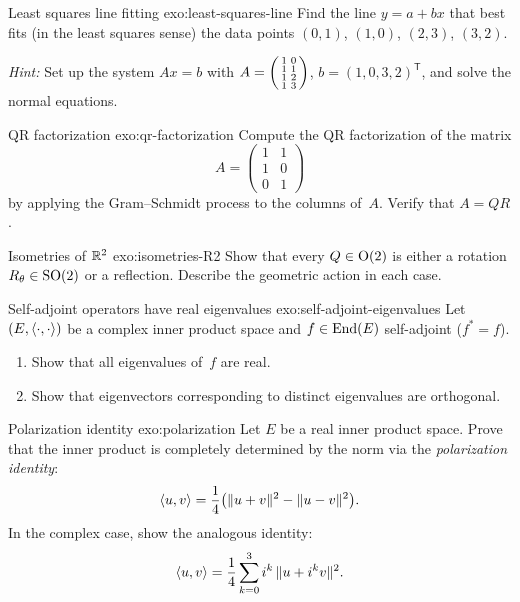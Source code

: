 \begin{exercise}{Least squares line fitting \intermediate}%
{exo:least-squares-line}
Find the line $y = a + bx$ that best fits (in the least squares sense)
the data points $(0,1)$, $(1,0)$, $(2,3)$, $(3,2)$.

\noindent\textit{Hint:} Set up the system $Ax = b$ with
$A = \begin{psmallmatrix} 1 & 0 \\ 1 & 1 \\ 1 & 2 \\ 1 & 3
\end{psmallmatrix}$, $b = (1,0,3,2)^{\mathsf{T}}$, and solve the
normal equations.
\end{exercise}

\begin{exercise}{QR factorization \intermediate}{exo:qr-factorization}
Compute the QR factorization of the matrix
\[
  A = \begin{pmatrix} 1 & 1 \\ 1 & 0 \\ 0 & 1 \end{pmatrix}
\]
by applying the Gram--Schmidt process to the columns of~$A$.
Verify that $A = QR$.
\end{exercise}

\begin{exercise}{Isometries of ${\mathbb{R}}^2$ \intermediate}{exo:isometries-R2}
Show that every $Q\in\operatorname{O}(2)$ is either a rotation
$R_\theta\in\operatorname{SO}(2)$ or a reflection.  Describe the geometric action in
each case.
\end{exercise}

\begin{exercise}{Self-adjoint operators have real eigenvalues \intermediate}%
{exo:self-adjoint-eigenvalues}
Let $(E,\langle\cdot,\cdot\rangle)$ be a complex inner product space and
$f\in\operatorname{End}(E)$ self-adjoint ($f^* = f$).
\begin{enumerate}[label=(\alph*)]
  \item Show that all eigenvalues of~$f$ are real.
  \item Show that eigenvectors corresponding to distinct eigenvalues
    are orthogonal.
\end{enumerate}
\end{exercise}

\begin{exercise}{Polarization identity \challenging}{exo:polarization}
Let $E$ be a real inner product space.  Prove that the inner product is
completely determined by the norm via the \emph{polarization identity}:
\[
  \langle u,v\rangle = \frac{1}{4}\bigl(\lVert u+v\rVert^2 - \lVert u-v\rVert^2\bigr).
\]
In the complex case, show the analogous identity:
\[
  \langle u,v\rangle = \frac{1}{4}\sum_{k=0}^{3} i^k\,\lVert u + i^k v\rVert^2.
\]
\end{exercise}


